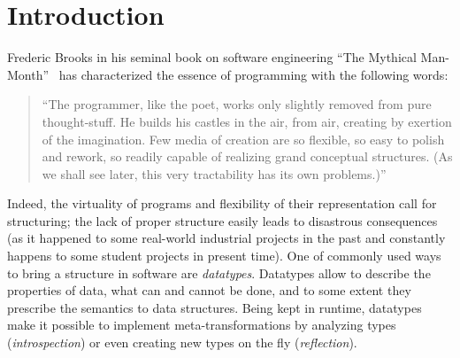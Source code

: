 \section{Introduction}

Frederic Brooks in his seminal book on software engineering ``The Mythical Man-Month''~\cite{MMM} has characterized the essence of programming with the following words:

\blockquote{``The programmer, like the poet, works only slightly removed from pure thought-stuff. He builds his castles in the air, from air, creating by exertion of the imagination. Few media of
creation are so flexible, so easy to polish and rework, so readily capable of realizing grand conceptual structures. (As we shall see later, this very tractability has its own problems.)''}

Indeed, the virtuality of programs and flexibility of their representation call for structuring; the lack of proper structure easily leads to disastrous consequences
(as it happened to some real-world industrial projects in the past and constantly happens to some student projects in present time). One of commonly used ways to bring a
structure in software are \emph{datatypes}. Datatypes allow to describe the properties of data, what can and cannot be done, and to some extent they prescribe
the semantics to data structures. Being kept in runtime, datatypes make it possible to implement meta-transformations by analyzing types (\emph{introspection})
or even creating new types on the fly (\emph{reflection}).

